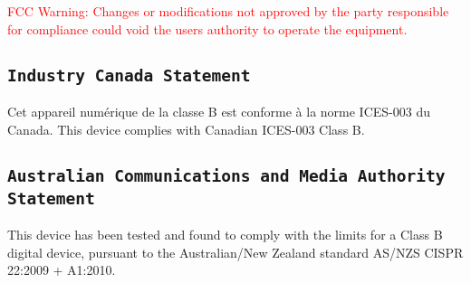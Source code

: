 \textcolor{red}{FCC Warning:}
\textcolor{red}{Changes or modifications not approved by the party responsible for compliance could void the users authority to operate the equipment.}


\subsection{\texttt{Industry Canada Statement}}
Cet appareil numérique de la classe B est conforme à la norme ICES-003
du Canada. This device complies with Canadian ICES-003 Class B.

\subsection{\texttt{Australian Communications and Media Authority Statement}}
This device has been tested and found to comply with the limits for a
Class B digital device, pursuant to the Australian/New Zealand standard AS/NZS CISPR 22:2009 + A1:2010.
